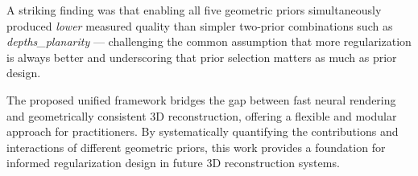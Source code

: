A striking finding was that enabling all five geometric priors simultaneously produced \emph{lower} measured quality than simpler two-prior combinations such as \textit{depths\_\allowbreak planarity} — challenging the common assumption that more regularization is always better and underscoring that prior selection matters as much as prior design.

The proposed unified framework bridges the gap between fast neural rendering and geometrically consistent 3D reconstruction, offering a flexible and modular approach for practitioners. By systematically quantifying the contributions and interactions of different geometric priors, this work provides a foundation for informed regularization design in future 3D reconstruction systems.
